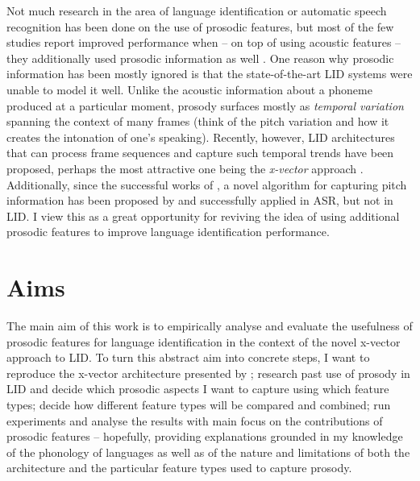 \documentclass[bsc,frontabs,twoside,singlespacing,parskip,deptreport]{infthesis}
\begin{document}
{{    %
    Not much research in the area of language identification or automatic speech recognition has been done on the use of prosodic features, but most of the few studies report improved performance when -- on top of using acoustic features -- they additionally used prosodic information as well \citep{Martinez_et_al_2012,Martinez_et_al_2013,Metze_et_al_2013}.
    One reason why prosodic information has been mostly ignored is that the state-of-the-art LID systems were unable to model it well. Unlike the acoustic information about a phoneme produced at a particular moment, prosody surfaces mostly as \textit{temporal variation} spanning the context of many frames (think of the pitch variation and how it creates the intonation of one's speaking). Recently, however, LID architectures that can process frame sequences and capture such temporal trends have been proposed, perhaps the most attractive one being the \textit{x-vector} approach \citet{Snyder_et_al_2018}.
    Additionally, since the successful works of \citeauthor{Martinez_et_al_2012}, a novel algorithm for capturing pitch information has been proposed by \citet{Ghahremani_et_al_2014} and successfully applied in ASR, but not in LID.
    I view this as a great opportunity for reviving the idea of using additional prosodic features to improve language identification performance.
  }
  \section{Aims}{
    \label{sec:aims}
    The main aim of this work is to empirically analyse and evaluate the usefulness of prosodic features for language identification in the context of the novel x-vector approach to LID.
    To turn this abstract aim into concrete steps, I want to reproduce the x-vector architecture presented by \citet{Snyder_et_al_2018}; research past use of prosody in LID and decide which prosodic aspects I want to capture using which feature types; decide how different feature types will be compared and combined; run experiments and analyse the results with main focus on the contributions of prosodic features -- hopefully, providing explanations grounded in my knowledge of the phonology of languages as well as of the nature and limitations of both the architecture and the particular feature types used to capture prosody.
  }
}
\end{document}
